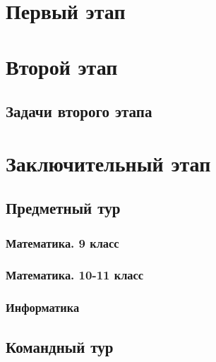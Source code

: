\documentclass[a4paper,12pt,oneside]{book}
\begin{document}

\setcounter{tocdepth}{1}

\tableofcontents

\part{Первый этап}

%
%

\part{Второй этап}
\clearpage
\chapter{Задачи второго этапа}

%

\part{Заключительный этап}

\clearpage
\chapter{Предметный тур}

\section{Математика. 9 класс}
%

\section{Математика. 10-11 класс}
%

\section{Информатика}
%

\chapter{Командный тур}

\end{document}
